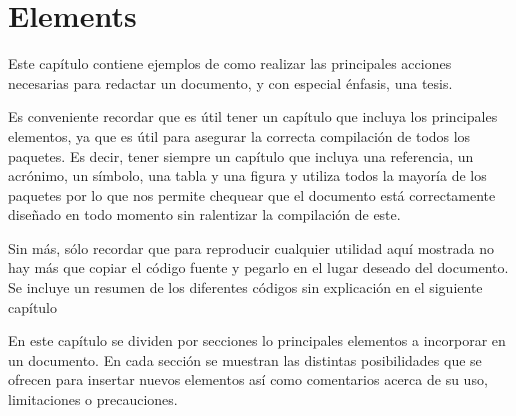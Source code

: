 \chapter{Elements}\label{ch:Elements}
\begin{chapter_resume}
Este capítulo contiene ejemplos de como realizar las principales acciones necesarias para redactar un documento, y con especial énfasis, una tesis.

\vspace{0.7cm}

Es conveniente recordar que es útil tener un capítulo que incluya los principales elementos, ya que es útil para asegurar la correcta compilación de todos los paquetes. 
Es decir, tener siempre un capítulo que incluya una referencia, un acrónimo, un símbolo, una tabla y una figura y utiliza todos la mayoría de los paquetes por lo que nos permite chequear que el documento está correctamente diseñado en todo momento sin ralentizar la compilación de este.

\vspace{0.7cm}

Sin más, sólo recordar que para reproducir cualquier utilidad aquí mostrada no hay más que copiar el código fuente y pegarlo en el lugar deseado del documento. Se incluye un resumen de los diferentes códigos sin explicación en el siguiente capítulo
\end{chapter_resume}
En este capítulo se dividen por secciones lo principales elementos a incorporar en un documento. En cada sección se muestran las distintas posibilidades que se ofrecen para insertar nuevos elementos así como comentarios acerca de su uso, limitaciones o precauciones.




